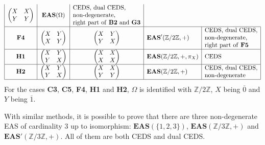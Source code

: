 \documentclass[10pt,a4paper]{amsart}
\numberwithin{equation}{section}
\newcommand{\eas}{\mathbf{EAS}}
\begin{document}
$$\begin{array}{|c|c|c|l|l|}
\begin{pmatrix}
X&X\\Y&Y
\end{pmatrix}&\eas(\Omega)&\begin{array}{@{}l@{}}\text{CEDS, dual CEDS},\\
\text{non-degenerate},\\
\text{right part of \textbf{B2} and \textbf{G3}}\end{array}\\
\hline \mathbf{F4}&\begin{pmatrix}
X&Y\\X&Y
\end{pmatrix}&
\begin{pmatrix}
X&Y\\Y&X
\end{pmatrix}&\eas'(\mathbb{Z}/2\mathbb{Z},+)&\begin{array}{@{}l@{}}\text{CEDS, dual CEDS},\\
\text{non-degenerate},\\
\text{right part of \textbf{F5}}\end{array}\\
\hline \mathbf{H1}&\begin{pmatrix}
X&Y\\Y&X
\end{pmatrix}&
\begin{pmatrix}
X&X\\X&X
\end{pmatrix}&\eas(\mathbb{Z}/2\mathbb{Z},+,\pi_X)&\text{CEDS}\\
\hline \mathbf{H2}&\begin{pmatrix}
X&Y\\Y&X
\end{pmatrix}&
\begin{pmatrix}
X&X\\Y&Y
\end{pmatrix}&\eas(\mathbb{Z}/2\mathbb{Z},+)&\begin{array}{@{}l@{}}\text{CEDS, dual CEDS},\\
\text{non-degenerate}\end{array}\\
\hline \end{array}
$$
For the cases \textbf{C3}, \textbf{C5}, \textbf{F4}, \textbf{H1} and \textbf{H2}, $\Omega$ is identified with $\mathbb{Z}/2\mathbb{Z}$, $X$ being $\overline{0}$ and $Y$ being $\overline{1}$.

\begin{Remark}
With similar methods, it is possible to prove that there are three non-degenerate EAS of cardinality 3 up to isomorphism: $\eas(\{1,2,3\})$, $\eas(\mathbb{Z}/3\mathbb{Z},+)$ and $\eas'(\mathbb{Z}/3\mathbb{Z},+)$. All of them are both CEDS and dual CEDS.
\end{Remark}
\end{document}
